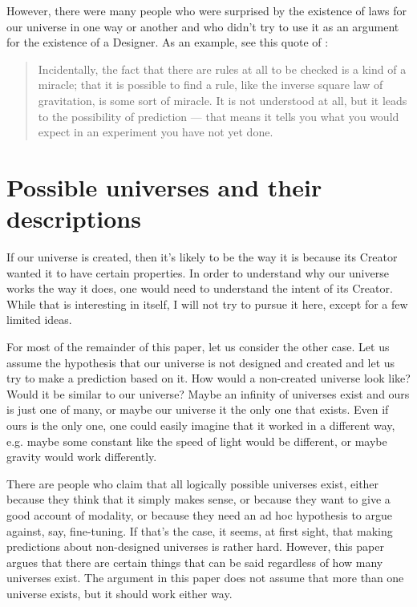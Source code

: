 \documentclass[a4paper
,draft
]{article}
\newcommand{\svn}[2][]{\todo[author=Virgil,color=red!25!white,#1]{#2}}
\newcommand{\paper}[1]{paper}
\newcommand{\ghilimele}[1]{``#1"}
\begin{document}
However, there were many people who were surprised by the existence of laws
for our universe in one way or another and who didn't try to use it
as an argument for the existence of a Designer.
As an example, see this quote of \textcite{Feynman2009}:
\begin{quote}
Incidentally, the fact that there are rules at all to be checked
is a kind of a miracle; that it is possible to find a rule,
like the inverse square law of gravitation, is some sort of miracle.
It is not understood at all, but it leads to the possibility of
prediction --- that means it tells you what you would expect in
an experiment you have not yet done.
\end{quote}


\section{Possible universes and their descriptions}
\label{sec:possible-universes}

If our universe is created, then it's likely to be the way it is because
its Creator wanted it to have certain properties.
In order to understand why our universe works the way it does,
one would need to understand the intent of its Creator.
While that is interesting in itself, I will not try to pursue it here,
except for a few limited ideas.

For most of the remainder of this \paper{}, let us consider the other case.
Let us assume the hypothesis that our universe is not designed and created
and let us try to make a prediction based on it.
How would a non-created universe look like?
Would it be similar to our universe?
Maybe an infinity of universes exist and ours is just one of many,
or maybe our universe it the only one that exists.
Even if ours is the only one, one could easily imagine that it worked
in a different way, e.g. maybe some constant like the speed of light would be
different, or maybe gravity would work differently.

There are people who claim that all logically possible universes exist,
either because they think that it simply makes sense, or because they want to
give a good account of modality, or because they need
an ad hoc\svn{Do I need the \ghilimele{ad-hoc} part?}{} hypothesis
to argue against, say, fine-tuning.
If that's the case, it seems, at first sight, that making predictions about
non-designed universes is rather hard.
However, this paper argues that there are certain things that can be said
regardless of how many universes exist.
The argument in this \paper{} does not assume that more than
one universe exists, but it should work either way.
\end{document}
